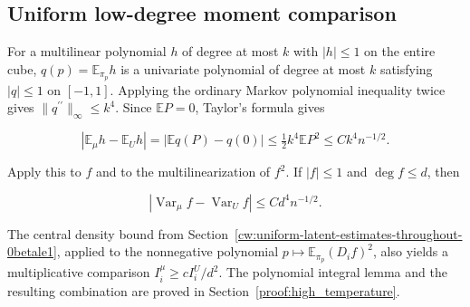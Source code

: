 \subsection{Uniform low-degree moment comparison}\label{cw:uniform-low-degree-moment-comparison}

For a multilinear polynomial $h$ of degree at most $k$ with \(|h|\le1\) on the entire cube, \(q(p)=\mathbb E_{\pi_p}h\) is a univariate polynomial of degree at most $k$ satisfying \(|q|\le1\) on \([-1,1]\). Applying the ordinary Markov polynomial inequality twice gives \(\lVert q^{\prime\prime}\rVert_\infty\le k^4\). Since \(\mathbb E P=0\), Taylor's formula gives

\[
|\mathbb E_\mu h-\mathbb E_Uh|
=|\mathbb E q(P)-q(0)|
\le\tfrac12 k^4\mathbb E P^2
\le Ck^4 n^{-1/2}.
\]

Apply this to $f$ and to the multilinearization of \(f^2\). If \(|f|\le1\) and \(\deg f\le d\), then

\[
\boxed{|\operatorname{Var}_{\mu}f-\operatorname{Var}_Uf|
\le Cd^4n^{-1/2}.}
\]

The central density bound from Section~\ref{cw:uniform-latent-estimates-throughout-0betale1}, applied to the nonnegative polynomial \(p\mapsto\mathbb E_{\pi_p}(D_i f)^2\), also yields a multiplicative comparison \(I_i^\mu\ge c I_i^U/d^2\). The polynomial integral lemma and the resulting combination are proved in Section~\ref{proof:high_temperature}.
